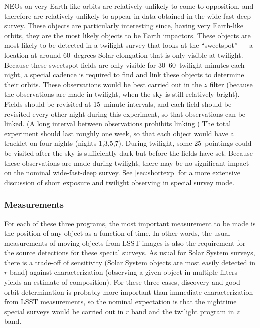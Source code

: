 \begin{itemize}
NEOs on very Earth-like orbits are relatively
unlikely to come to opposition, and therefore
are relatively unlikely to appear in data
obtained in the wide-fast-deep survey.
These objects are particularly interesting
since, having very Earth-like orbits, they
are the most likely objects to be Earth
impactors.
These objects are most likely to be detected
in a twilight survey that looks at the ``sweetspot'' ---
a location at around 60~degrees Solar
elongation that is only visible at twilight.
Because these sweetspot fields are only visible
for 30--60~twilight minutes each night,
a special
cadence is required to find and link these objects
to determine their orbits.
These observations would be best carried out
in the $z$ filter (because the observations are
made in twilight, when the sky is still relatively
bright). Fields should be revisited at 15~minute
intervals, and each field should be revisited
every other night during this experiment, so that
observations can be linked.
(A long interval
between observations prohibits linking.)
The total experiment
should last roughly one week, so that each
object would have a tracklet on four nights
(nights 1,3,5,7).
During twilight, some 25~pointings could be visited
after the sky is sufficiently dark but
before the fields have set.
Because these observations are made during twilight,
there may be no significant impact on the
nominal wide-fast-deep survey. See \autoref{sec:shortexp} for a more extensive discussion of short exposure and twilight observing in special survey mode.
\end{itemize}

\subsubsection{Measurements}

For each of these three programs, the most important measurement
to be made is the position of any object as a function of time.
In other words, the usual measurements of moving
objects from LSST images is also the requirement for
the source detections for these special surveys. As usual
for Solar System surveys, there is a trade-off of
sensitivity (Solar System objects are most easily
detected in $r$ band) against characterization (observing
a given object in multiple filters yields an estimate
of composition). For these three cases, discovery and
good orbit determination is probably more important than
immediate characterization from LSST measurements,
so the nominal expectation is that
the nighttime special surveys would be carried out in
$r$ band and the twilight program in $z$ band.


